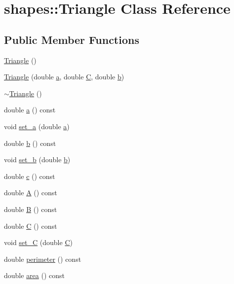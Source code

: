 \hypertarget{classshapes_1_1Triangle}{}\section{shapes\+::Triangle Class Reference}
\label{classshapes_1_1Triangle}
\subsection*{Public Member Functions}
\begin{DoxyCompactItemize}
\item 
\mbox{\hyperlink{classshapes_1_1Triangle_a587e926d8a98269151c481044be99ca5}{Triangle}} ()
\item 
\mbox{\hyperlink{classshapes_1_1Triangle_a9d9f28353d2b4f2879af36b9a04bf6e8}{Triangle}} (double \mbox{\hyperlink{classshapes_1_1Triangle_acdb468a706e3aba4c133af15e0ab5113}{a}}, double \mbox{\hyperlink{classshapes_1_1Triangle_aba40e175fdf19b46830c2138fceff821}{C}}, double \mbox{\hyperlink{classshapes_1_1Triangle_aeca17ef2853d0aa2155814a58afefca9}{b}})
\item 
\mbox{\hyperlink{classshapes_1_1Triangle_a8b33a30adfc9bc6c1c009a78268613c2}{$\sim$\+Triangle}} ()
\item 
double \mbox{\hyperlink{classshapes_1_1Triangle_acdb468a706e3aba4c133af15e0ab5113}{a}} () const
\item 
void \mbox{\hyperlink{classshapes_1_1Triangle_a66d51c6099afdebff6eaf7a1e71a6258}{set\+\_\+a}} (double \mbox{\hyperlink{classshapes_1_1Triangle_acdb468a706e3aba4c133af15e0ab5113}{a}})
\item 
double \mbox{\hyperlink{classshapes_1_1Triangle_aeca17ef2853d0aa2155814a58afefca9}{b}} () const
\item 
void \mbox{\hyperlink{classshapes_1_1Triangle_a43fe7a0be28a62214ca3f4bdd84de65a}{set\+\_\+b}} (double \mbox{\hyperlink{classshapes_1_1Triangle_aeca17ef2853d0aa2155814a58afefca9}{b}})
\item 
double \mbox{\hyperlink{classshapes_1_1Triangle_a9d52acfa086b1bfd664c12ab09a75d89}{c}} () const
\item 
double \mbox{\hyperlink{classshapes_1_1Triangle_a824b7330173b7d71fa3fb362d6a53593}{A}} () const
\item 
double \mbox{\hyperlink{classshapes_1_1Triangle_a2457121bdda9751b350debb0bd3c9389}{B}} () const
\item 
double \mbox{\hyperlink{classshapes_1_1Triangle_aba40e175fdf19b46830c2138fceff821}{C}} () const
\item 
void \mbox{\hyperlink{classshapes_1_1Triangle_add2da87e5cb6f9509b4b6e374a0dc0e1}{set\+\_\+C}} (double \mbox{\hyperlink{classshapes_1_1Triangle_aba40e175fdf19b46830c2138fceff821}{C}})
\item 
double \mbox{\hyperlink{classshapes_1_1Triangle_a79c8a69fd152f3af3436364db0212aec}{perimeter}} () const
\item 
double \mbox{\hyperlink{classshapes_1_1Triangle_a4673869657670f09b79dfce87dbc6f09}{area}} () const
\end{DoxyCompactItemize}


